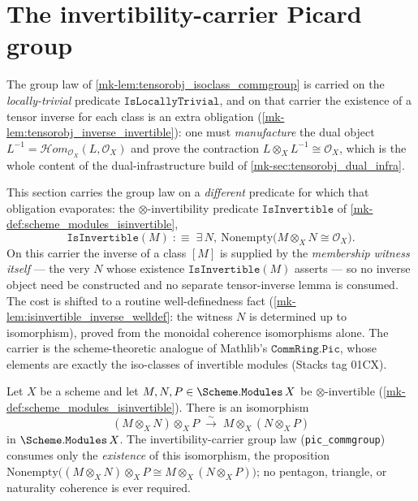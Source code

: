 \section{The invertibility-carrier Picard group}
\label{mk-sec:tensorobj_pic_carrier}

The group law of \ref{mk-lem:tensorobj_isoclass_commgroup} is carried on the
\emph{locally-trivial} predicate \(\mathtt{IsLocallyTrivial}\), and on that carrier
the existence of a tensor inverse for each class is an extra obligation
(\ref{mk-lem:tensorobj_inverse_invertible}): one must \emph{manufacture} the dual
object \(L^{-1} = \mathcal{H}om_{\mathcal{O}_X}(L, \mathcal{O}_X)\) and prove the
contraction \(L \otimes_X L^{-1} \cong \mathcal{O}_X\), which is the whole content of
the dual-infrastructure build of \ref{mk-sec:tensorobj_dual_infra}.

This section carries the group law on a \emph{different} predicate for which that
obligation evaporates: the \(\otimes\)-invertibility predicate
\(\mathtt{IsInvertible}\) of \ref{mk-def:scheme_modules_isinvertible},
\[
  \mathtt{IsInvertible}(M)
  \;:\equiv\;
  \exists\, N,\ \mathrm{Nonempty}\bigl(M \otimes_X N \cong \mathcal{O}_X\bigr).
\]
On this carrier the inverse of a class \([M]\) is supplied by the \emph{membership
witness itself} --- the very \(N\) whose existence \(\mathtt{IsInvertible}(M)\)
asserts --- so no inverse object need be constructed and no separate
tensor-inverse lemma is consumed. The cost is shifted to a routine
well-definedness fact (\ref{mk-lem:isinvertible_inverse_welldef}: the witness \(N\) is
determined up to isomorphism), proved from the monoidal coherence isomorphisms
alone. The carrier is the scheme-theoretic analogue of Mathlib's
\(\mathtt{CommRing.Pic}\), whose elements are exactly the iso-classes of invertible
modules (Stacks tag 01CX).

\begin{lemma}\label{mk-lem:tensorobj_assoc_iso_invertible}
  \leanok

  Let \(X\) be a scheme and let
  \(M, N, P \in \Scheme.\mathtt{Modules}\,X\) be \(\otimes\)-invertible
  (\ref{mk-def:scheme_modules_isinvertible}). There is an isomorphism
  \[
    (M \otimes_X N) \otimes_X P
      \;\xrightarrow{\ \sim\ }\;
    M \otimes_X (N \otimes_X P)
  \]
  in \(\Scheme.\mathtt{Modules}\,X\). The invertibility-carrier group law
  (\texttt{pic\_commgroup}) consumes only the \emph{existence} of this
  isomorphism, the proposition \(\mathrm{Nonempty}\bigl((M \otimes_X N) \otimes_X P
  \cong M \otimes_X (N \otimes_X P)\bigr)\); no pentagon, triangle, or naturality
  coherence is ever required.
\end{lemma}

